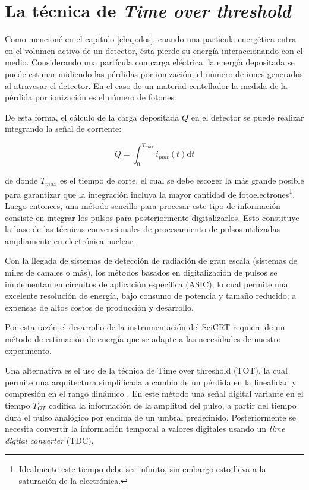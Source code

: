 \section{La técnica de \emph{Time over threshold}}

Como mencioné en el capitulo \ref{chap:dos}, cuando una partícula energética entra en el volumen activo de un detector, ésta pierde su energía interaccionando con el medio. Considerando una partícula con carga eléctrica, la energía depositada se puede estimar midiendo las pérdidas por ionización; el número de iones generados al atravesar el detector. En el caso de un material centellador la medida de la pérdida por ionización es el número de fotones.

De esta forma, el cálculo de la carga depositada $Q$ en el detector se puede realizar integrando la señal de corriente:

\begin{equation}
\label{equ:charge}
Q=\int_{0}^{T_{max}} i_{pmt}\left(t\right)\mathrm{d}t
\end{equation}

de donde $T_{max}$ es el tiempo de corte, el cual se debe escoger la más grande posible para garantizar que la integración incluya la mayor cantidad de fotoelectrones\footnote{Idealmente este tiempo debe ser infinito, sin embargo esto lleva a la saturación de la electrónica.}. Luego entonces, una método sencillo para procesar este tipo de información consiste en integrar los pulsos para posteriormente digitalizarlos. Esto constituye la base de las técnicas convencionales de procesamiento de pulsos utilizadas ampliamente en electrónica nuclear.

Con la llegada de sistemas de detección de radiación de gran escala (sistemas de miles de canales o más), los métodos basados en digitalización de pulsos se implementan en circuitos de aplicación específica (ASIC); lo cual permite una excelente resolución de energía, bajo consumo de potencia y tamaño reducido; a expensas de altos costos de producción y desarrollo.

Por esta razón el desarrollo de la instrumentación del SciCRT requiere de un método de estimación de energía que se adapte a las necesidades de nuestro experimento.

Una alternativa es el uso de la técnica de Time over threshold (TOT), la cual permite una arquitectura simplificada a cambio de un pérdida en la linealidad y compresión en el rango dinámico \cite{fujiwara10}. En este método una señal digital variante en el tiempo $T_{OT}$ codifica la información de la amplitud del pulso, a partir del tiempo dura el pulso analógico por encima de un umbral predefinido. Posteriormente se necesita convertir la información temporal a valores digitales usando un \emph{time digital converter} (TDC).

